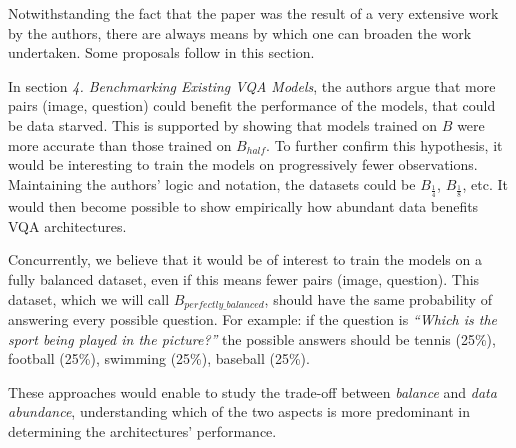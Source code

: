\documentclass[letterpaper,11pt]{article}
\begin{document}
Notwithstanding the fact that the paper was the result of a very extensive work by the authors, there are always means by which one can broaden the work undertaken. Some proposals follow in this section.

In section \textit{4. Benchmarking Existing VQA Models}, the authors argue that more pairs (image, question) could benefit the performance of the models, that could be data starved. This is supported by showing that models trained on $B$ were more accurate than those trained on $B_{half}$. To further confirm this hypothesis, it would be interesting to train the models on progressively fewer observations. Maintaining the authors' logic and notation, the datasets could be $B_{\frac{1}{4}}$, $B_{\frac{1}{8}}$, etc. It would then become possible to show empirically how abundant data benefits VQA architectures.

Concurrently, we believe that it would be of interest to train the models on a fully balanced dataset, even if this means fewer pairs (image, question). This dataset, which we will call $B_{perfectly\_balanced}$, should have the same probability of answering every possible question. For example: if the question is \textit{``Which is the sport being played in the picture?''} the possible answers should be tennis (25\%), football (25\%), swimming (25\%), baseball (25\%).

These approaches would enable to study the trade-off between \textit{balance} and \textit{data abundance}, understanding which of the two aspects is more predominant in determining the architectures' performance.



\newpage



\end{document}
